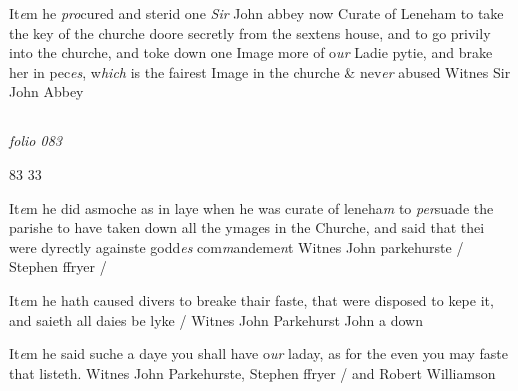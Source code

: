 \documentclass[12pt, a4paper]{book}
\begin{document}
		\ifthenelse{\isodd{\thepage}}
		{\reversemarginpar}
		{\normalmarginpar}
		It\textit{e}m he \textit{pro}cured and sterid one \textit{Sir} John abbey now Curate of
 Leneham to take the key of the churche doore secretly from
 the sextens house, and to go privily into the churche, and
 toke down one Image more of o\textit{ur} Ladie pytie, and brake her
 in pec\textit{es}, w\textit{hich} is the fairest Image in the churche \& nev\textit{er} abused
 Witnes Sir John Abbey
 


\dotfill
					  \subsection*{}

\textit{folio 083}


\begin{flushright}{\color{Mahogany}83} 33\end{flushright}

		\ifthenelse{\isodd{\thepage}}
		{\reversemarginpar}
		{\normalmarginpar}
		 It\textit{e}m he did asmoche as in laye when he was curate of leneha\textit{m}
 to \textit{per}suade the parishe to have taken down all the ymages in the
 Churche, and said that thei were dyrectly againste godd\textit{es} com\textit{m}andeme\textit{n}t
	Witnes John parkehurste / Stephen ffryer /

	
			
	
				\marginpar[\vspace{0.5cm}{\textcolor{Gray}{fastynge dayes}}]{}
			
	
		\ifthenelse{\isodd{\thepage}}
		{\reversemarginpar}
		{\normalmarginpar}
		It\textit{e}m he hath caused divers to breake thair faste, that were disposed
		to kepe it, and saieth all daies be lyke / Witnes John Parkehurst
		John a down
 
		\ifthenelse{\isodd{\thepage}}
		{\reversemarginpar}
		{\normalmarginpar}
		It\textit{e}m he said suche a daye you shall have o\textit{ur} laday, as for the even
 	you may faste that listeth. Witnes John Parkehurste, Stephen
 		ffryer / and Robert Williamson
	
		
				\marginpar[\vspace{0.5cm}{\textcolor{Gray}{Anno 1542}}]{}
			
\end{document}
